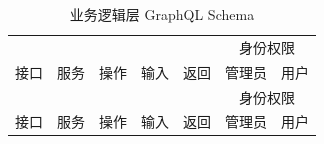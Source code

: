 \begin{center}
    \begin{longtable}{lcccccc}
        \caption{\label{schema}业务逻辑层 GraphQL Schema}                                                         \\
        \toprule
                       &      &      &                 &            & \multicolumn{2}{c}{身份权限}                \\
        \cmidrule{6-7}
        接口           & 服务 & 操作 & 输入            & 返回       & 管理员                       & 用户         \\
        \midrule
        \endfirsthead

        \toprule
                       &      &      &                 &            & \multicolumn{2}{c}{身份权限}                \\
        \cmidrule{6-7}
        接口           & 服务 & 操作 & 输入            & 返回       & 管理员                       & 用户         \\
        \midrule
        \endhead


\end{longtable}
\end{center}
